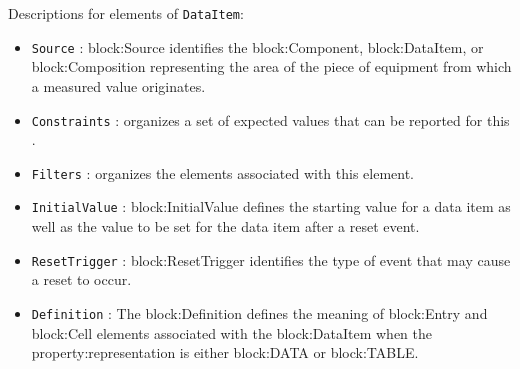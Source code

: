 Descriptions for elements of \texttt{DataItem}:

\begin{itemize}
\item \texttt{Source} : {block:Source} identifies the {block:Component}, {block:DataItem}, or {block:Composition} representing the area of the piece of equipment from which a measured value originates.
\item \texttt{Constraints} :  \gls{organizes} a set of expected values that can be reported for this .
\item \texttt{Filters} :  \gls{organizes} the  elements associated with this  element. 
\item \texttt{InitialValue} : {block:InitialValue} defines the starting value for a data item as well as the value to be set for the data item after a reset event.
\item \texttt{ResetTrigger} : {block:ResetTrigger} identifies the type of event that may cause a reset to occur.
\item \texttt{Definition} : The {block:Definition} defines the meaning of {block:Entry} and {block:Cell} elements associated with the {block:DataItem} when the {property:representation} is either {block:DATA} or {block:TABLE}.
\end{itemize}
\FloatBarrier
